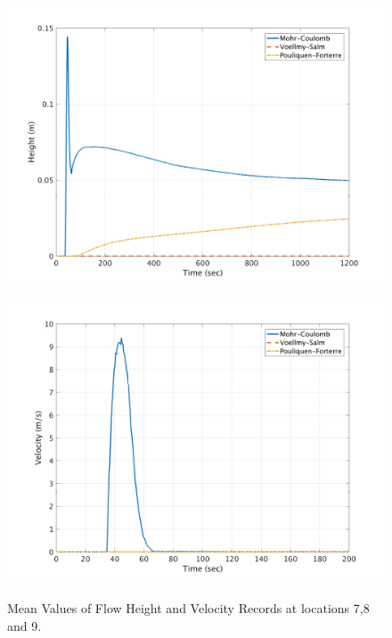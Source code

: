 \documentclass[a4paper,10pt]{article}
\begin{document}
\begin{figure}[H]
	\begin{minipage}[b]{0.5\linewidth}
	\centering
    \includegraphics[width=1\textwidth]{HeightMeans/H9All.png}     
        \label{fig:MFHR_L9}
	\end{minipage}
	\begin{minipage}[b]{0.5\linewidth}
	\centering
    \includegraphics[width=1\textwidth]{VelocityMeans/V9All.png}
        \label{fig:MFVR_L9}
	\end{minipage}
		
	\caption{Mean Values of Flow Height and Velocity Records at locations 7,8 and 9.}\label{fig:MFHVR_L789}	
\end{figure}
\end{document}
